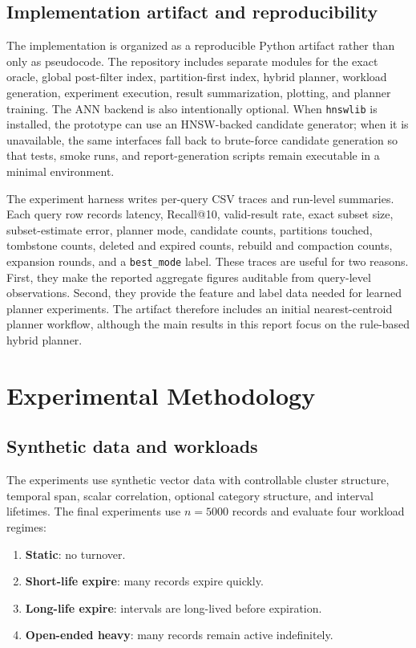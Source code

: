 \documentclass[sigconf,nonacm]{acmart}
\begin{document}
\subsection{Implementation artifact and reproducibility}

The implementation is organized as a reproducible Python artifact rather than only as pseudocode. The repository includes separate modules for the exact oracle, global post-filter index, partition-first index, hybrid planner, workload generation, experiment execution, result summarization, plotting, and planner training. The ANN backend is also intentionally optional. When \texttt{hnswlib} is installed, the prototype can use an HNSW-backed candidate generator; when it is unavailable, the same interfaces fall back to brute-force candidate generation so that tests, smoke runs, and report-generation scripts remain executable in a minimal environment.

The experiment harness writes per-query CSV traces and run-level summaries. Each query row records latency, Recall@10, valid-result rate, exact subset size, subset-estimate error, planner mode, candidate counts, partitions touched, tombstone counts, deleted and expired counts, rebuild and compaction counts, expansion rounds, and a \texttt{best\_mode} label. These traces are useful for two reasons. First, they make the reported aggregate figures auditable from query-level observations. Second, they provide the feature and label data needed for learned planner experiments. The artifact therefore includes an initial nearest-centroid planner workflow, although the main results in this report focus on the rule-based hybrid planner.

\section{Experimental Methodology}

\subsection{Synthetic data and workloads}

The experiments use synthetic vector data with controllable cluster structure, temporal span, scalar correlation, optional category structure, and interval lifetimes. The final experiments use $n=5000$ records and evaluate four workload regimes:
\begin{enumerate}[leftmargin=*,nosep]
    \item \textbf{Static}: no turnover.
    \item \textbf{Short-life expire}: many records expire quickly.
    \item \textbf{Long-life expire}: intervals are long-lived before expiration.
    \item \textbf{Open-ended heavy}: many records remain active indefinitely.
\end{enumerate}
\end{document}
